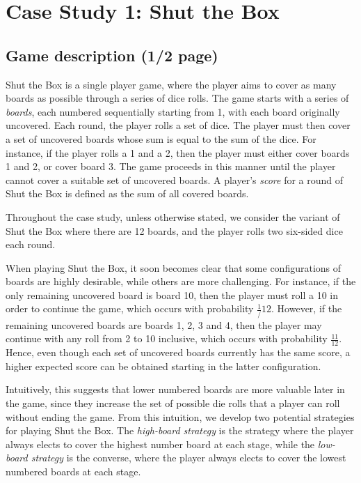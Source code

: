 \chapter{Case Study 1: Shut the Box}
\label{cs1}

\section{Game description (1/2 page)}
\label{cs1:stb_description}
Shut the Box is a single player game, where the player aims to cover as many boards as possible through a series of dice rolls. The game starts with a series of \emph{boards}, each numbered sequentially starting from 1, with each board originally uncovered. Each round, the player rolls a set of dice. The player must then cover a set of uncovered boards whose sum is equal to the sum of the dice. For instance, if the player rolls a 1 and a 2, then the player must either cover boards 1 and 2, or cover board 3. The game proceeds in this manner until the player cannot cover a suitable set of uncovered boards. A player's \emph{score} for a round of Shut the Box is defined as the sum of all covered boards.

Throughout the case study, unless otherwise stated, we consider the variant of Shut the Box where there are 12 boards, and the player rolls two six-sided dice each round.

When playing Shut the Box, it soon becomes clear that some configurations of boards are highly desirable, while others are more challenging. For instance, if the only remaining uncovered board is board 10, then the player must roll a 10 in order to continue the game, which occurs with probability $\frac{1}/{12}$. However, if the remaining uncovered boards are boards 1, 2, 3 and 4, then the player may continue with any roll from 2 to 10 inclusive, which occurs with probability $\frac{11}{12}$. Hence, even though each set of uncovered boards currently has the same score, a higher expected score can be obtained starting in the latter configuration. 

Intuitively, this suggests that lower numbered boards are more valuable later in the game, since they increase the set of possible die rolls that a player can roll without ending the game. From this intuition, we develop two potential strategies for playing Shut the Box. The \emph{high-board strategy} is the strategy where the player always elects to cover the highest number board at each stage, while the \emph{low-board strategy} is the converse, where the player always elects to cover the lowest numbered boards at each stage.

